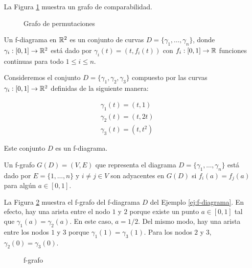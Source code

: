 \begin{ejemplo}
La Figura \ref{fig:grafo_comparabilidad} muestra un grafo de comparabilidad.

\begin{figure}[htb]
\centering
\ejemplografocomparabilidad
\caption{Grafo de permutaciones}
\label{fig:grafo_comparabilidad}
\end{figure}
\end{ejemplo}

\begin{defi}
Un f-diagrama en $\mathbb{R}^2$ es un conjunto de curvas $D = \{\gamma_1,\dots, \gamma_n \}$, donde $\gamma_i : [0,1] \to \mathbb{R}^2$ está dado por $\gamma_i(t) = (t, f_i(t))$ con $f_i : [0,1] \to \mathbb{R}$ funciones continuas para todo $1 \leq i \leq n$.
\end{defi}

\begin{ejemplo} \label{ej:f-diagrama}
Consideremos el conjunto $D = \{\gamma_1, \gamma_2, \gamma_3\}$ compuesto por las curvas $\gamma_i : [0,1] \to \mathbb{R}^2$ definidas de la siguiente manera:

\begin{eqnarray*}
\gamma_1(t) = (t,1)\\
\gamma_2(t) = (t,2t)\\
\gamma_3(t) = (t, t^2)
\end{eqnarray*}

Este conjunto $D$ es un f-diagrama.

\end{ejemplo}

\begin{defi}
Un f-grafo $G(D) = (V,E)$ que representa el diagrama $D = \{\gamma_1,\dots, \gamma_n \}$ está dado por $E = \{1,\dots, n\}$ y $i \neq j \in V$ son adyacentes en $G(D)$ si $f_i(a) = f_j(a)$ para algún $a \in [0,1]$.
\end{defi}

\begin{ejemplo}
La Figura \ref{fig:f-grafo} muestra el f-grafo del f-diagrama $D$ del Ejemplo \ref{ej:f-diagrama}. En efecto, hay una arista entre el nodo $1$ y $2$ porque existe un punto $a \in [0,1]$ tal que $\gamma_1(a) = \gamma_2(a)$. En este caso, $a = 1/2$. Del mismo modo, hay una arista entre los nodos $1$ y $3$ porque $\gamma_1(1) = \gamma_3(1)$. Para los nodos $2$ y $3$, $\gamma_2(0) = \gamma_3(0)$. 

\begin{figure}[htb]
\centering
\ejemplogfgrafo
\caption{f-grafo}
\label{fig:f-grafo}
\end{figure}
\end{ejemplo}

